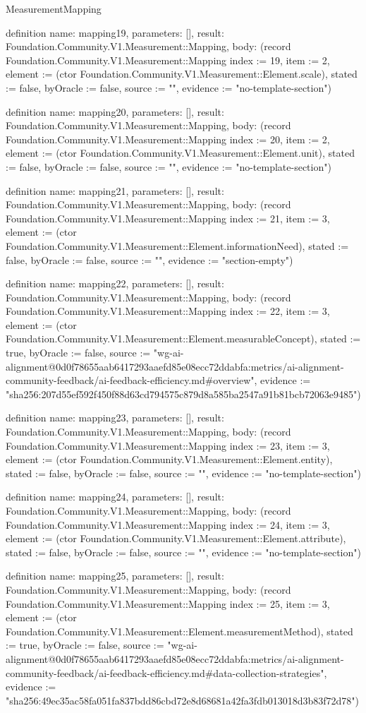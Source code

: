 \begin{lexlean}{MeasurementMapping}
\begin{semanticmodule}
definition{
  name: mapping19,
  parameters: [],
  result: Foundation.Community.V1.Measurement::Mapping,
  body: (record Foundation.Community.V1.Measurement::Mapping {index := 19, item := 2, element := (ctor Foundation.Community.V1.Measurement::Element.scale), stated := false, byOracle := false, source := "", evidence := "no-template-section"})
}

definition{
  name: mapping20,
  parameters: [],
  result: Foundation.Community.V1.Measurement::Mapping,
  body: (record Foundation.Community.V1.Measurement::Mapping {index := 20, item := 2, element := (ctor Foundation.Community.V1.Measurement::Element.unit), stated := false, byOracle := false, source := "", evidence := "no-template-section"})
}

definition{
  name: mapping21,
  parameters: [],
  result: Foundation.Community.V1.Measurement::Mapping,
  body: (record Foundation.Community.V1.Measurement::Mapping {index := 21, item := 3, element := (ctor Foundation.Community.V1.Measurement::Element.informationNeed), stated := false, byOracle := false, source := "", evidence := "section-empty"})
}

definition{
  name: mapping22,
  parameters: [],
  result: Foundation.Community.V1.Measurement::Mapping,
  body: (record Foundation.Community.V1.Measurement::Mapping {index := 22, item := 3, element := (ctor Foundation.Community.V1.Measurement::Element.measurableConcept), stated := true, byOracle := false, source := "wg-ai-alignment@0d0f78655aab6417293aaefd85e08ecc72ddabfa:metrics/ai-alignment-community-feedback/ai-feedback-efficiency.md#overview", evidence := "sha256:207d55ef592f450f88d63cd794575c879d8a585ba2547a91b81bcb72063e9485"})
}

definition{
  name: mapping23,
  parameters: [],
  result: Foundation.Community.V1.Measurement::Mapping,
  body: (record Foundation.Community.V1.Measurement::Mapping {index := 23, item := 3, element := (ctor Foundation.Community.V1.Measurement::Element.entity), stated := false, byOracle := false, source := "", evidence := "no-template-section"})
}

definition{
  name: mapping24,
  parameters: [],
  result: Foundation.Community.V1.Measurement::Mapping,
  body: (record Foundation.Community.V1.Measurement::Mapping {index := 24, item := 3, element := (ctor Foundation.Community.V1.Measurement::Element.attribute), stated := false, byOracle := false, source := "", evidence := "no-template-section"})
}

definition{
  name: mapping25,
  parameters: [],
  result: Foundation.Community.V1.Measurement::Mapping,
  body: (record Foundation.Community.V1.Measurement::Mapping {index := 25, item := 3, element := (ctor Foundation.Community.V1.Measurement::Element.measurementMethod), stated := true, byOracle := false, source := "wg-ai-alignment@0d0f78655aab6417293aaefd85e08ecc72ddabfa:metrics/ai-alignment-community-feedback/ai-feedback-efficiency.md#data-collection-strategies", evidence := "sha256:49ec35ac58fa051fa837bdd86cbd72e8d68681a42fa3fdb013018d3b83f72d78"})
}


\end{semanticmodule}
\end{lexlean}
